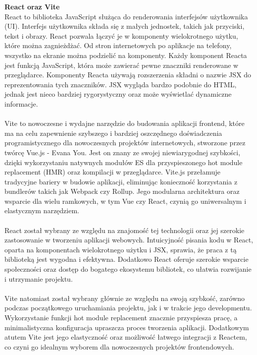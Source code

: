 \documentclass[12pt,a4paper]{article}
\begin{document}
\noindent \textbf{React oraz Vite}\\
React to biblioteka JavaScript służąca do renderowania interfejsów użytkownika (UI). Interfejs użytkownika składa się z małych jednostek, takich jak przyciski, tekst i obrazy. React pozwala łączyć je w komponenty wielokrotnego użytku, które można zagnieżdżać. Od stron internetowych po aplikacje na telefony, wszystko na ekranie można podzielić na komponenty. Każdy komponent Reacta jest funkcją JavaScript, która może zawierać pewne znaczniki renderowane w przeglądarce. Komponenty Reacta używają rozszerzenia składni o nazwie JSX do reprezentowania tych znaczników. JSX wygląda bardzo podobnie do HTML, jednak jest nieco bardziej rygorystyczny oraz może wyświetlać dynamiczne informacje. 
\\\\
Vite to nowoczesne i wydajne  narzędzie do budowania aplikacji frontend, które ma na celu zapewnienie szybszego i bardziej oszczędnego doświadczenia programistycznego dla nowoczesnych projektów internetowych, stworzone przez twórcę Vue.js - Evana You. Jest on znany ze swojej niewiarygodnej szybkości, dzięki wykorzystaniu natywnych modułów ES dla przyspieszonego hot module replacement (HMR) oraz kompilacji w przeglądarce. Vite.js przełamuje tradycyjne bariery w budowie aplikacji, eliminując konieczność korzystania z bundlerów takich jak Webpack czy Rollup. Jego modularna architektura oraz wsparcie dla wielu ramkowych, w tym Vue czy React, czynią go uniwersalnym i elastycznym narzędziem.
\\\\
React został wybrany ze względu na znajomość tej technologii oraz jej szerokie zastosowanie w tworzeniu aplikacji webowych. Intuicyjność pisania kodu w React, oparta na komponentach wielokrotnego użytku i JSX, sprawia, że praca z tą biblioteką jest wygodna i efektywna. Dodatkowo React oferuje szerokie wsparcie społeczności oraz dostęp do bogatego ekosystemu bibliotek, co ułatwia rozwijanie i utrzymanie projektu.
\\\\
Vite natomiast został wybrany głównie ze względu na swoją szybkość, zarówno podczas początkowego uruchamiania projektu, jak i w trakcie jego developmentu. Wykorzystanie funkcji hot module replacement znacznie przyspiesza pracę, a minimalistyczna konfiguracja upraszcza proces tworzenia aplikacji. Dodatkowym atutem Vite jest jego elastyczność oraz możliwość łatwego integracji z Reactem, co czyni go idealnym wyborem dla nowoczesnych projektów frontendowych.
\\\\
\end{document}
